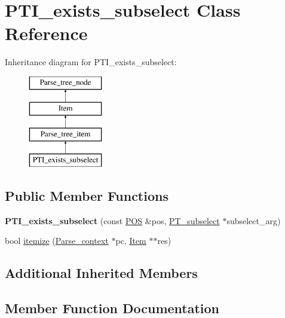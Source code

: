 \hypertarget{classPTI__exists__subselect}{}\section{P\+T\+I\+\_\+exists\+\_\+subselect Class Reference}
\label{classPTI__exists__subselect}
Inheritance diagram for P\+T\+I\+\_\+exists\+\_\+subselect\+:\begin{figure}[H]
\begin{center}
\leavevmode
\includegraphics[height=4.000000cm]{classPTI__exists__subselect}
\end{center}
\end{figure}
\subsection*{Public Member Functions}
\begin{DoxyCompactItemize}
\item 
\mbox{\label{classPTI__exists__subselect_a142e8735d1dd35910406b75a2669a6fc}} 
{\bfseries P\+T\+I\+\_\+exists\+\_\+subselect} (const \mbox{\hyperlink{structYYLTYPE}{P\+OS}} \&pos, \mbox{\hyperlink{classPT__subselect}{P\+T\+\_\+subselect}} $\ast$subselect\+\_\+arg)
\item 
bool \mbox{\hyperlink{classPTI__exists__subselect_a5b09ebe0df087993855c962e583559bb}{itemize}} (\mbox{\hyperlink{structParse__context}{Parse\+\_\+context}} $\ast$pc, \mbox{\hyperlink{classItem}{Item}} $\ast$$\ast$res)
\end{DoxyCompactItemize}
\subsection*{Additional Inherited Members}


\subsection{Member Function Documentation}
\mbox{\label{classPTI__exists__subselect_a5b09ebe0df087993855c962e583559bb}} 
